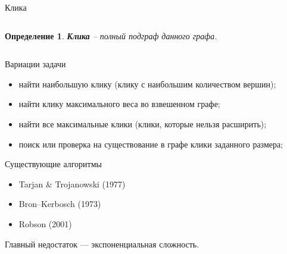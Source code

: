 \documentclass{beamer}
\theoremstyle{plain}
\newtheorem{defi}{Определение}
\begin{document}
\begin{frame} {Клика}
  \begin{columns}[T] %
    \begin{column}[T]{5cm} %
      \begin{defi}
        \textbf{Клика} -- полный подграф данного графа.
      \end{defi}
    \end{column}
    \begin{column}[T]{5cm} %
      \begin{figure}
        \centering
        \def\svgwidth{\columnwidth}
        
      \end{figure}
    \end{column}
  \end{columns}
\end{frame}


\begin{frame}{Вариации задачи}
  \begin{itemize}
    \item
    найти наибольшую клику (клику с наибольшим количеством вершин);

    \item
    найти клику максимального веса во взвешенном графе;

    \item
    найти все максимальные клики (клики, которые нельзя расширить);

    \item
    поиск или проверка на существование в графе клики заданного размера;
  \end{itemize}
\end{frame}

\begin{frame}{Существующие алгоритмы}
  \begin{itemize}
    \item Tarjan \& Trojanowski (1977)
    \item Bron–Kerbosch (1973)
    \item Robson (2001)
  \end{itemize}
  Главный недостаток --- экспоненциальная сложность.
\end{frame}
\end{document}
